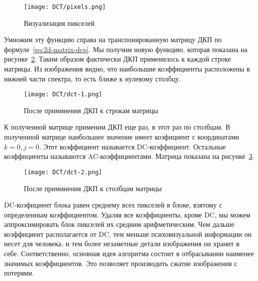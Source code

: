 \begin{figure}[ht!]
    \centering
    \caption{Визуализация пикселей}
    \texttt{[image: DCT/pixels.png]}
    \label{img:pixels-dct}
\end{figure}

Умножим эту функцию справа на транспонированную матрицу ДКП
по формуле~\ref{eq:2d-matrix-dcp}. Мы получим новую функцию,
которая показана на рисунке~\ref{img:dct-1}.
Таким образом фактически ДКП применилось к каждой строке матрицы.
Из изображения видно, что наибольшие коэффициенты расположены
в нижней части спектра, то есть ближе к нулевому столбцу.

\begin{figure}[ht!]
    \centering
    \caption{После приминения ДКП к строкам матрицы}
    \texttt{[image: DCT/dct-1.png]}
    \label{img:dct-1}
\end{figure}

К полученной матрице применим ДКП еще раз, в этот раз по столбцам.
В полученной матрице наибольшее значение имеет коэфициент с координатами
$k = 0, j = 0$. Этот коэффициент называется DC-коэффициент.
Остальные коэффициенты называются AC-коэффициентами.
Матрица показана на рисунке~\ref{img:dct-2}.

\begin{figure}[ht!]
    \centering
    \caption{После приминения ДКП к столбцам матрицы}
    \texttt{[image: DCT/dct-2.png]}
    \label{img:dct-2}
\end{figure}

DC-коэфициент блока равен среднему всех пикселей в блоке,
взятому с определенным коэффициентом. Удаляя все коэффициенты,
кроме DC, мы можем аппроксимировать блок пикселей их средним
арифметическим. Чем дальше коэффициент располагается от DC,
тем меньше психовизуальной информации он несет для человека,
и тем более незаметные детали изображения он хранит в себе.
Соответственно, основная идея алгоритма состоит в отбрасывании
наименее значимых коэффициентов. Это позволяет производить сжатие
изображения с потерями.

